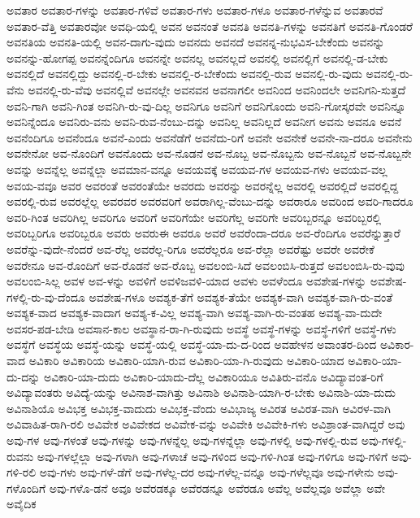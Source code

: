 {ಅವತಾರ
ಅವತಾರ-ಗಳನ್ನು
ಅವತಾರ-ಗಳಿವೆ
ಅವತಾರ-ಗಳು
ಅವತಾರ-ಗಳೂ
ಅವತಾರ-ಗಳೆನ್ನುವ
ಅವತಾರವೆ
ಅವತಾರ-ವೆತ್ತಿ
ಅವತಾರವೋ
ಅವಧಿ-ಯಲ್ಲಿ
ಅವನ
ಅವನಂತೆ
ಅವನತಿ
ಅವನತಿ-ಗಳನ್ನು
ಅವನತಿಗೆ
ಅವನತಿ-ಗೊಂಡರೆ
ಅವನತಿಯ
ಅವನತಿ-ಯಲ್ಲಿ
ಅವನ-ದಾಗು-ವುದು
ಅವನದು
ಅವನದೆ
ಅವನನ್ನ-ನುಭವಿಸ-ಬೇಕೆಂದು
ಅವನನ್ನು
ಅವನನ್ನು-ಹೋಗಪ್ಪ
ಅವನನ್ನೆಂದಿಗೂ
ಅವನನ್ನೇ
ಅವನಲ್ಲ
ಅವನಲ್ಲದೆ
ಅವನಲ್ಲಿ
ಅವನಲ್ಲಿಗೆ
ಅವನಲ್ಲಿ-ಡ-ಬೇಕು
ಅವನಲ್ಲಿದೆ
ಅವನಲ್ಲಿದ್ದು
ಅವನಲ್ಲಿ-ರ-ಬೇಕು
ಅವನಲ್ಲಿ-ರ-ಬೇಕೆಂದು
ಅವನಲ್ಲಿ-ರುವ
ಅವನಲ್ಲಿ-ರು-ವುದು
ಅವನಲ್ಲಿ-ರು-ವೆನು
ಅವನಲ್ಲಿ-ರು-ವೆವು
ಅವನಲ್ಲಿವೆ
ಅವನಲ್ಲೇ
ಅವನವನ
ಅವನಾಗಲೀ
ಅವನಿಂದ
ಅವನಿಂದಲೇ
ಅವನಿಗನಿ-ಸುತ್ತದೆ
ಅವನಿ-ಗಾಗಿ
ಅವನಿ-ಗಿಂತ
ಅವನಿಗಿ-ರು-ವು-ದಿಲ್ಲ
ಅವನಿಗೂ
ಅವನಿಗೆ
ಅವನಿಗೊಂದು
ಅವನಿ-ಗೋಸ್ಕರವೇ
ಅವನಿನ್ನೂ
ಅವನಿನ್ನೆಂದೂ
ಅವನಿರು-ವನು
ಅವನಿ-ರುವ-ನೆಂಬು-ದನ್ನು
ಅವನಿಲ್ಲ
ಅವನಿಲ್ಲದೆ
ಅವನೀಗ
ಅವನು
ಅವನೂ
ಅವನೆ
ಅವನೆಂದಿಗೂ
ಅವನೆಂದೂ
ಅವನೆ-ಎಂದು
ಅವನೆಡೆಗೆ
ಅವನೆದು-ರಿಗೆ
ಅವನೇ
ಅವನೇಕೆ
ಅವನೇ-ನಾ-ದರೂ
ಅವನೇನು
ಅವನೇನೋ
ಅವ-ನೊಂದಿಗೆ
ಅವನೊಂದು
ಅವ-ನೊಡನೆ
ಅವ-ನೊಬ್ಬ
ಅವ-ನೊಬ್ಬನು
ಅವ-ನೊಬ್ಬನೆ
ಅವ-ನೊಬ್ಬನೇ
ಅವನ್ನು
ಅವನ್ನೆಲ್ಲ
ಅವನ್ನೆಲ್ಲಾ
ಅವಮಾನ-ವನ್ನೂ
ಅವಯವಕ್ಕೆ
ಅವಯವ-ಗಳ
ಅವಯವ-ಗಳು
ಅವಯವ-ವಲ್ಲ
ಅವಯ-ವವೂ
ಅವರ
ಅವರಂತೆ
ಅವರಂತೆಯೇ
ಅವರದು
ಅವರನ್ನು
ಅವರನ್ನೆಲ್ಲ
ಅವರಲ್ಲಿ
ಅವರಲ್ಲಿದೆ
ಅವರಲ್ಲಿದ್ದ
ಅವರಲ್ಲಿ-ರುವ
ಅವರಲ್ಲೆಲ್ಲ
ಅವರವರ
ಅವರವರಿಗೆ
ಅವರಾಗಿಲ್ಲ-ವೆಂಬು-ದನ್ನು
ಅವರಾರೂ
ಅವರಿಂದ
ಅವರಿ-ಗಾದರೂ
ಅವರಿ-ಗಿಂತ
ಅವರಿಗಿಲ್ಲ
ಅವರಿಗೂ
ಅವರಿಗೆ
ಅವರಿಗೆಯೇ
ಅವರಿಗೆಲ್ಲ
ಅವರಿಗೇ
ಅವರಿಬ್ಬರನ್ನೂ
ಅವರಿಬ್ಬರಲ್ಲಿ
ಅವರಿಬ್ಬರಿಗೂ
ಅವರಿಬ್ಬರೂ
ಅವರು
ಅವರುಈ
ಅವರೂ
ಅವರೆ
ಅವರೆಂದಾ-ದರೂ
ಅವ-ರೆಂದಿಗೂ
ಅವರೆನ್ನುತ್ತಾರೆ
ಅವರೆನ್ನು-ವುದೇ-ನೆಂದರೆ
ಅವ-ರೆಲ್ಲ
ಅವರೆಲ್ಲ-ರಿಗೂ
ಅವರೆಲ್ಲರೂ
ಅವ-ರೆಲ್ಲಾ
ಅವರೆಷ್ಟು
ಅವರೇ
ಅವರೇಕೆ
ಅವರೇನೂ
ಅವ-ರೊಂದಿಗೆ
ಅವ-ರೊಡನೆ
ಅವ-ರೊಬ್ಬ
ಅವಲಂಬಿ-ಸಿದೆ
ಅವಲಂಬಿಸಿ-ರುತ್ತದೆ
ಅವಲಂಬಿಸಿ-ರು-ವುವು
ಅವಲಂಬಿ-ಸಿಲ್ಲ
ಅವಳ
ಅವ-ಳನ್ನು
ಅವಳಿಗೆ
ಅವಳಿಜವಳಿ-ಯಾದ
ಅವಳು
ಅವಳೆಂದೂ
ಅವಶೇಷ-ಗಳನ್ನು
ಅವಶೇಷ-ಗಳಲ್ಲಿ-ರು-ವು-ದೆಂದೂ
ಅವಶೇಷ-ಗಳೂ
ಅವಶ್ಯಕ-ತೆಗೆ
ಅವಶ್ಯಕ-ತೆಯೇ
ಅವಶ್ಯಕ-ವಾಗಿ
ಅವಶ್ಯಕ-ವಾಗಿ-ರು-ವಂತೆ
ಅವಶ್ಯಕ-ವಾದ
ಅವಶ್ಯಕ-ವಾದಾಗ
ಅವಶ್ಯ-ಕ-ವಿಲ್ಲ
ಅವಶ್ಯ-ವಾಗಿ
ಅವಶ್ಯ-ವಾಗಿ-ರು-ವಂತಹ
ಅವಶ್ಯ-ವಾ-ದುದೇ
ಅವಸರ-ಪಡ-ಬೇಡಿ
ಅವಸಾನ-ಕಾಲ
ಅವಸ್ಥಾನ-ರಾ-ಗಿ-ರುವುದು
ಅವಸ್ಥೆ
ಅವಸ್ಥೆ-ಗಳನ್ನು
ಅವಸ್ಥೆ-ಗಳಿಗೆ
ಅವಸ್ಥೆ-ಗಳು
ಅವಸ್ಥೆಗೆ
ಅವಸ್ಥೆಯ
ಅವಸ್ಥೆ-ಯನ್ನು
ಅವಸ್ಥೆ-ಯಲ್ಲಿ
ಅವಸ್ಥೆ-ಯಾ-ದು-ದ-ರಿಂದ
ಅವಹೇಳನ
ಅವಾಂತರ-ದಿಂದ
ಅವಿಕಾರ-ವಾದ
ಅವಿಕಾರಿ
ಅವಿಕಾರಿಯ
ಅವಿಕಾರಿ-ಯಾಗಿ-ರುವ
ಅವಿಕಾರಿ-ಯಾ-ಗಿ-ರುವುದು
ಅವಿಕಾರಿ-ಯಾದ
ಅವಿಕಾರಿ-ಯಾ-ದು-ದನ್ನು
ಅವಿಕಾರಿ-ಯಾ-ದುದು
ಅವಿಕಾರಿ-ಯಾದು-ದೆಲ್ಲ
ಅವಿಕಾರಿಯೂ
ಅವಿತಿರು-ವನೊ
ಅವಿದ್ಯಾವಂತ-ರಿಗೆ
ಅವಿದ್ಯಾವಂತರು
ಅವಿದ್ಯೆ-ಯನ್ನು
ಅವಿನಾಶ-ವಾಗಿತ್ತು
ಅವಿನಾಶಿ
ಅವಿನಾಶಿ-ಯಾಗಿ-ರ-ಬೇಕು
ಅವಿನಾಶಿ-ಯಾ-ದುದು
ಅವಿನಾಶಿಯೊ
ಅವಿಭಕ್ತ
ಅವಿಭಕ್ತ-ವಾದುದು
ಅವಿಭಕ್ತ-ವೆಂದು
ಅವಿಭಾಜ್ಯ
ಅವಿರತ
ಅವಿರತ-ವಾಗಿ
ಅವಿರಳ-ವಾಗಿ
ಅವಿವಾಹಿತ-ರಾಗಿ-ರಲಿ
ಅವಿವೇಕ
ಅವಿವೇಕದ
ಅವಿವೇಕ-ವನ್ನು
ಅವಿವೇಕಿ
ಅವಿವೇಕಿ-ಗಳು
ಅವಿಶ್ರಾಂತ-ವಾಗಿದ್ದರೆ
ಅವು
ಅವು-ಗಳ
ಅವು-ಗಳಂತೆ
ಅವು-ಗಳನ್ನು
ಅವು-ಗಳನ್ನೆಲ್ಲ
ಅವು-ಗಳನ್ನೆಲ್ಲಾ
ಅವು-ಗಳಲ್ಲಿ
ಅವು-ಗಳಲ್ಲಿ-ರುವ
ಅವು-ಗಳಲ್ಲಿ-ರುವನು
ಅವು-ಗಳಲ್ಲೆಲ್ಲಾ
ಅವು-ಗಳಾಗಿ
ಅವು-ಗಳಾಚೆ
ಅವು-ಗಳಿಂದ
ಅವು-ಗಳಿ-ಗಿಂತ
ಅವು-ಗಳಿಗೂ
ಅವು-ಗಳಿಗೆ
ಅವು-ಗಳಿ-ರಲಿ
ಅವು-ಗಳು
ಅವು-ಗಳೆ-ಡೆಗೆ
ಅವು-ಗಳೆಲ್ಲ-ದರ
ಅವು-ಗಳೆಲ್ಲ-ವನ್ನೂ
ಅವು-ಗಳೆಲ್ಲವೂ
ಅವು-ಗಳೇನು
ಅವು-ಗಳೊಂದಿಗೆ
ಅವು-ಗಳೊ-ಡನೆ
ಅವೂ
ಅವೆರಡಕ್ಕೂ
ಅವೆರಡನ್ನೂ
ಅವೆರಡೂ
ಅವೆಲ್ಲ
ಅವೆಲ್ಲವೂ
ಅವೆಲ್ಲಾ
ಅವೇ
ಅವೈದಿಕ
}
